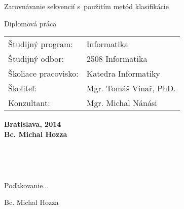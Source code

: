 \documentclass[a4paper,12pt,openany,oneside,headings=optiontohead]{scrbook} %
\theoremstyle{definition}
\def\mftitle{Zarovnávanie sekvencií s~použitím metód klasifikácie}
\def\mfthesistype{Diplomová práca}
\def\mfauthor{Bc. Michal Hozza}
\def\mfadvisor{Mgr. Tomáš Vinař, PhD.}
\def\mfconsultant{Mgr. Michal Nánási}
\def\mfdate{2014}
\def\mfplacedate{Bratislava, \mfdate}
\begin{document}
\vfill
\begin{center}
\begin{minipage}{1\textwidth}
\bigskip\bigskip
\begin{center}
\linespread{1}\LARGE\sc\mftitle
\end{center}
\smallskip
\centerline{\mfthesistype}
\bigskip
\bigskip
\bigskip\bigskip
\end{minipage}
\end{center}
\vfill
\begin{minipage}{0.8\textwidth}
\begin{tabular}{l l}
Študijný program:& Informatika \\
Študijný odbor:& 2508 Informatika \\
Školiace pracovisko:& Katedra Informatiky\\
Školiteľ:&   \mfadvisor \\
Konzultant:&   \mfconsultant \\
\end{tabular}
\end{minipage}
\begin{center}
\end{center}
\vfill
{\bf\mfplacedate\\
\indent\mfauthor}
\eject %


%
%
%

%

{~}\vspace{12cm}

\noindent
\begin{minipage}{0.25\textwidth}~\end{minipage}
\begin{center}
\begin{minipage}{1\textwidth}
Poďakovanie...
\end{minipage}
\end{center}
\hfill\mfauthor
\vfill\eject %
\end{document}
